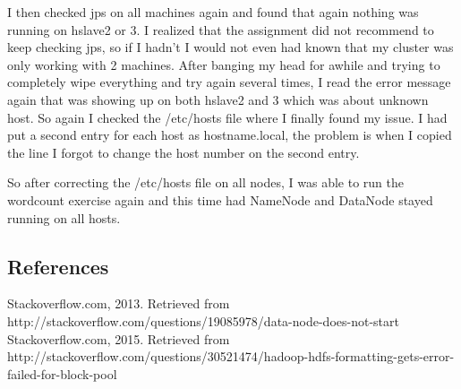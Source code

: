 \documentclass[10pt]{article}
\begin{document}
I then checked jps on all machines again and found that again nothing was running on hslave2 or 3. I realized that the assignment did not recommend to keep checking jps, so if I hadn't I would not even had known that my cluster was only working with 2 machines. After banging my head for awhile and trying to completely wipe everything and try again several times, I read the error message again that was showing up on both hslave2 and 3 which was about unknown host. So again I checked the /etc/hosts file where I finally found my issue. I had put a second entry for each host as hostname.local, the problem is when I copied the line I forgot to change the host number on the second entry.
\par
{}%
\hfill
{}%
\par
So after correcting the /etc/hosts file on all nodes, I was able to run the wordcount exercise again and this time had NameNode and DataNode stayed running on all hosts. 
\par
{}%
\hfill
{}%
\par

\subsection*{References}
Stackoverflow.com, 2013. Retrieved from http://stackoverflow.com/questions/19085978/data-node-does-not-start\\
Stackoverflow.com, 2015. Retrieved from http://stackoverflow.com/questions/30521474/hadoop-hdfs-formatting-gets-error-failed-for-block-pool
\end{document}
